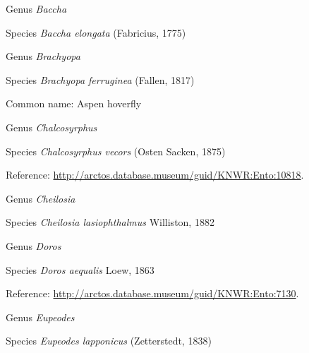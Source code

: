 \documentclass[9pt, article]{memoir}
\begin{document}
\begin{multicols}{2}
\vspace{6pt}\noindent\hspace{30pt}Genus \textit{Baccha}


\vspace{6pt}\noindent\hspace{36pt}Species \textit{Baccha elongata} (Fabricius, 1775)


\vspace{6pt}\noindent\hspace{30pt}Genus \textit{Brachyopa}


\vspace{6pt}\noindent\hspace{36pt}Species \textit{Brachyopa ferruginea} (Fallen, 1817)


Common name: Aspen hoverfly

\vspace{6pt}\noindent\hspace{30pt}Genus \textit{Chalcosyrphus}


\vspace{6pt}\noindent\hspace{36pt}Species \textit{Chalcosyrphus vecors} (Osten Sacken, 1875)


Reference: 
\url{http://arctos.database.museum/guid/KNWR:Ento:10818}.

\vspace{6pt}\noindent\hspace{30pt}Genus \textit{Cheilosia}


\vspace{6pt}\noindent\hspace{36pt}Species \textit{Cheilosia lasiophthalmus} Williston, 1882


\vspace{6pt}\noindent\hspace{30pt}Genus \textit{Doros}


\vspace{6pt}\noindent\hspace{36pt}Species \textit{Doros aequalis} Loew, 1863


Reference: 
\url{http://arctos.database.museum/guid/KNWR:Ento:7130}.

\vspace{6pt}\noindent\hspace{30pt}Genus \textit{Eupeodes}


\vspace{6pt}\noindent\hspace{36pt}Species \textit{Eupeodes lapponicus} (Zetterstedt, 1838)



\end{multicols}
\end{document}
